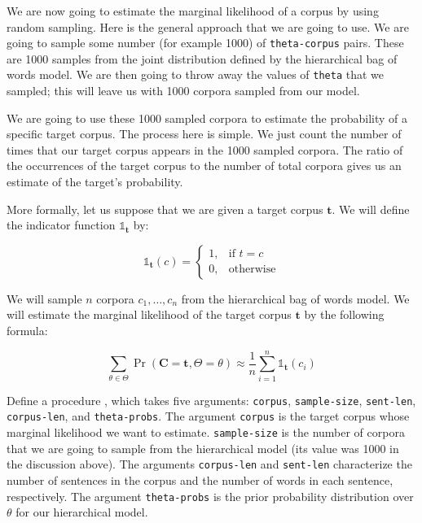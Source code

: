 \documentclass[10pt]{article}
\newcommand{\required}[1]{{\color{blue}{#1}}}
\begin{document}
 We are now going to estimate the marginal likelihood of a
corpus by using random sampling. Here is the general approach that we
are going to use. We are going to sample some number (for example
1000) of \texttt{theta-corpus} pairs. These are 1000 samples from the
joint distribution defined by the hierarchical bag of words model. We
are then going to throw away the values of \texttt{theta} that we
sampled; this will leave us with 1000 corpora sampled from our model.

We are going to use these 1000 sampled corpora to estimate
the probability of a specific target corpus. The process here is
simple. We just count the number of times that our target corpus
appears in the 1000 sampled corpora. The ratio of the occurrences of
the target corpus to the number of total corpora gives us an estimate
of the target's probability.

More formally, let us suppose that we are given a target
corpus $\mathbf{t}$. We will define the indicator function
$\mathds{1}_{\mathbf{t}}$ by:

\begin{equation}
\mathds{1}_{\mathbf{t}}(c) =
\begin{cases}
    1, & \text{if } t = c\\
    0, & \text{otherwise}
\end{cases}
\end{equation}

 We will sample $n$ corpora $c_1,\ldots,c_n$ from the
hierarchical bag of words model. We will estimate the marginal
likelihood of the target corpus $\mathbf{t}$ by the following formula:

\begin{equation}
\label{eq:montecarlo-marginal}
\sum_{\theta \in \Theta} \Pr(\mathbf{C}=\mathbf{t}, \Theta=\theta)  \approx \frac{1}{n} \sum_{i=1}^{n}\mathds{1}_{\mathbf{t}}(c_i) 
\end{equation}

 Define a procedure
\required{\texttt{estimate-corpus-marginal}}, which takes five
arguments: \texttt{corpus}, \texttt{sample-size}, \texttt{sent-len},
\texttt{corpus-len}, and \texttt{theta-probs}. The argument
\texttt{corpus} is the target corpus whose marginal likelihood we want
to estimate. \texttt{sample-size} is the number of corpora that we are
going to sample from the hierarchical model (its value was 1000 in the
discussion above). The arguments \texttt{corpus-len} and
\texttt{sent-len} characterize the number of sentences in the corpus
and the number of words in each sentence, respectively. The argument
\texttt{theta-probs} is the prior probability distribution over
$\theta$ for our hierarchical model.
\end{document}
